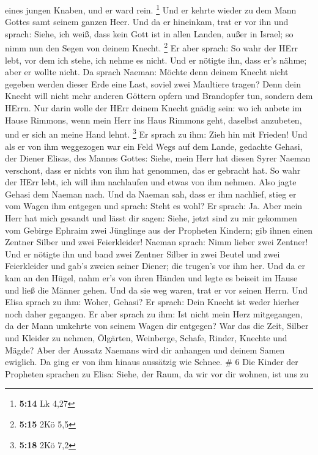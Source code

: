 eines jungen Knaben, und er ward rein. \footnote{\textbf{5:14} Lk 4,27}
 Und er kehrte wieder zu dem Mann Gottes samt seinem ganzen
Heer. Und da er hineinkam, trat er vor ihn und sprach: Siehe, ich weiß,
dass kein Gott ist in allen Landen, außer in Israel; so nimm nun den
Segen von deinem Knecht. \footnote{\textbf{5:15} 2Kö 5,5} 
Er aber sprach: So wahr der HErr lebt, vor dem ich stehe, ich nehme es
nicht. Und er nötigte ihn, dass er's nähme; aber er wollte nicht.
 Da sprach Naeman: Möchte denn deinem Knecht nicht gegeben
werden dieser Erde eine Last, soviel zwei Maultiere tragen? Denn dein
Knecht will nicht mehr anderen Göttern opfern und Brandopfer tun,
sondern dem HErrn.  Nur darin wolle der HErr deinem Knecht
gnädig sein: wo ich anbete im Hause Rimmons, wenn mein Herr ins Haus
Rimmons geht, daselbst anzubeten, und er sich an meine Hand lehnt.
\footnote{\textbf{5:18} 2Kö 7,2}  Er sprach zu ihm: Zieh
hin mit Frieden! Und als er von ihm weggezogen war ein Feld Wegs auf dem
Lande,  gedachte Gehasi, der Diener Elisas, des Mannes
Gottes: Siehe, mein Herr hat diesen Syrer Naeman verschont, dass er
nichts von ihm hat genommen, das er gebracht hat. So wahr der HErr lebt,
ich will ihm nachlaufen und etwas von ihm nehmen.  Also
jagte Gehasi dem Naeman nach. Und da Naeman sah, dass er ihm nachlief,
stieg er vom Wagen ihm entgegen und sprach: Steht es wohl? 
Er sprach: Ja. Aber mein Herr hat mich gesandt und lässt dir sagen:
Siehe, jetzt sind zu mir gekommen vom Gebirge Ephraim zwei Jünglinge aus
der Propheten Kindern; gib ihnen einen Zentner Silber und zwei
Feierkleider!  Naeman sprach: Nimm lieber zwei Zentner! Und
er nötigte ihn und band zwei Zentner Silber in zwei Beutel und zwei
Feierkleider und gab's zweien seiner Diener; die trugen's vor ihm her.
 Und da er kam an den Hügel, nahm er's von ihren Händen und
legte es beiseit im Hause und ließ die Männer gehen.  Und
da sie weg waren, trat er vor seinen Herrn. Und Elisa sprach zu ihm:
Woher, Gehasi? Er sprach: Dein Knecht ist weder hierher noch daher
gegangen.  Er aber sprach zu ihm: Ist nicht mein Herz
mitgegangen, da der Mann umkehrte von seinem Wagen dir entgegen? War das
die Zeit, Silber und Kleider zu nehmen, Ölgärten, Weinberge, Schafe,
Rinder, Knechte und Mägde?  Aber der Aussatz Naemans wird
dir anhangen und deinem Samen ewiglich. Da ging er von ihm hinaus
aussätzig wie Schnee. \# 6  Die Kinder der Propheten
sprachen zu Elisa: Siehe, der Raum, da wir vor dir wohnen, ist uns zu
